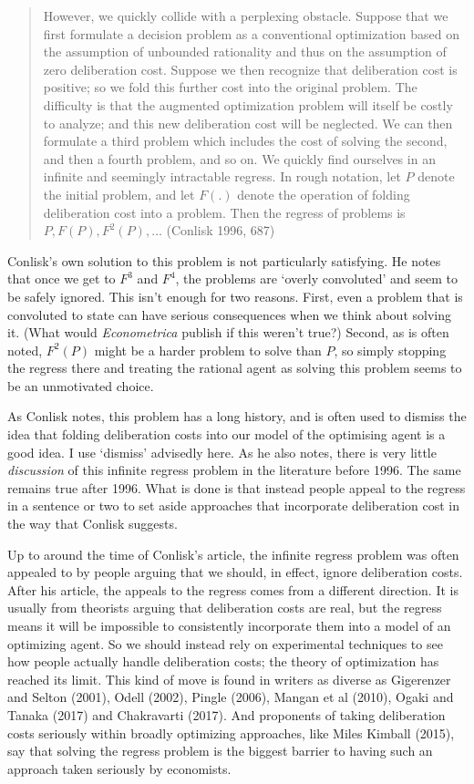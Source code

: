 \documentclass[
  12pt,
]{article}
\begin{document}
\begin{quote}
However, we quickly collide with a perplexing obstacle. Suppose that we first formulate a decision problem as a conventional optimization based on the assumption of unbounded rationality and thus on the assumption of zero deliberation cost. Suppose we then recognize that deliberation cost is positive; so we fold this further cost into the original problem. The difficulty is that the augmented optimization problem will itself be costly to analyze; and this new deliberation cost will be neglected. We can then formulate a third problem which includes the cost of solving the second, and then a fourth problem, and so on. We quickly find ourselves in an infinite and seemingly intractable regress. In rough notation, let \(P\) denote the initial problem, and let \(F(.)\) denote the operation of folding deliberation cost into a problem. Then the regress of problems is \(P, F(P), F^2(P), \ldots\) (Conlisk 1996, 687)
\end{quote}

Conlisk's own solution to this problem is not particularly satisfying. He notes that once we get to \(F^3\) and \(F^4\), the problems are `overly convoluted' and seem to be safely ignored. This isn't enough for two reasons. First, even a problem that is convoluted to state can have serious consequences when we think about solving it. (What would \emph{Econometrica} publish if this weren't true?) Second, as is often noted, \(F^2(P)\) might be a harder problem to solve than \(P\), so simply stopping the regress there and treating the rational agent as solving this problem seems to be an unmotivated choice.

As Conlisk notes, this problem has a long history, and is often used to dismiss the idea that folding deliberation costs into our model of the optimising agent is a good idea. I use `dismiss' advisedly here. As he also notes, there is very little \emph{discussion} of this infinite regress problem in the literature before 1996. The same remains true after 1996. What is done is that instead people appeal to the regress in a sentence or two to set aside approaches that incorporate deliberation cost in the way that Conlisk suggests.

Up to around the time of Conlisk's article, the infinite regress problem was often appealed to by people arguing that we should, in effect, ignore deliberation costs. After his article, the appeals to the regress comes from a different direction. It is usually from theorists arguing that deliberation costs are real, but the regress means it will be impossible to consistently incorporate them into a model of an optimizing agent. So we should instead rely on experimental techniques to see how people actually handle deliberation costs; the theory of optimization has reached its limit. This kind of move is found in writers as diverse as Gigerenzer and Selton (2001), Odell (2002), Pingle (2006), Mangan et al (2010), Ogaki and Tanaka (2017) and Chakravarti (2017). And proponents of taking deliberation costs seriously within broadly optimizing approaches, like Miles Kimball (2015), say that solving the regress problem is the biggest barrier to having such an approach taken seriously by economists.
\end{document}
